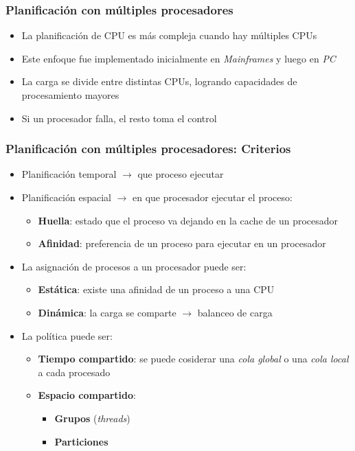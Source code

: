 \begin{frame}
  \frametitle{Planificación con múltiples procesadores}
	\begin{itemize}
		\item La planificación de CPU es más compleja cuando hay múltiples CPUs	
		\item Este enfoque fue implementado inicialmente en \textit{Mainframes} y luego en \textit{PC}
		\item La carga se divide entre distintas CPUs, logrando capacidades de procesamiento mayores
		\item Si un procesador falla, el resto toma el control
	\end{itemize}
\end{frame}

\begin{frame}
  \frametitle{Planificación con múltiples procesadores: \textbf{Criterios}}
	\begin{itemize}
		\item Planificación temporal $\rightarrow$ que proceso ejecutar
		\item Planificación espacial $\rightarrow$ en que procesador ejecutar el proceso:		
		\begin{itemize}
			\item \textbf{Huella}: estado que el proceso va dejando en la cache de un procesador
			\item \textbf{Afinidad}: preferencia de un proceso para ejecutar en un procesador 
		\end{itemize}
		\item La asignación de procesos a un procesador puede ser:
		\begin{itemize}
			\item \textbf{Estática}: existe una afinidad de un proceso a una CPU
			\item \textbf{Dinámica}: la carga se comparte $\rightarrow$ balanceo de carga
		\end{itemize}
		\item La política puede ser:
		\begin{itemize}
			\item \textbf{Tiempo compartido}: se puede cosiderar una \emph{cola global} o una \emph{cola local} a cada procesado
			\item \textbf{Espacio compartido}:
			\begin{itemize}
				\item \textbf{Grupos} (\emph{threads})
				\item \textbf{Particiones}
			\end{itemize}
		\end{itemize}		
	\end{itemize}
\end{frame}

